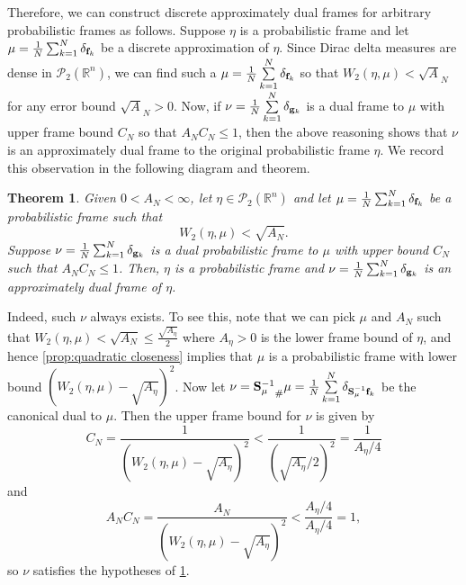 \documentclass{amsart}
\numberwithin{equation}{section}
\theoremstyle{plain}
\newtheorem{theorem}{Theorem}[section]
\theoremstyle{remark}
\theoremstyle{definition}
\begin{document}
Therefore, we can construct discrete approximately dual frames for arbitrary probabilistic frames as follows. Suppose $\eta$ is a probabilistic frame and let $\mu = \frac{1}{N}\sum_{k=1}^N \delta_{{\bf f}_k}$ be a discrete approximation of $\eta$. Since Dirac delta measures are dense in $\mathcal{P}_2(\mathbb{R}^n)$, we can find such a $\mu =\frac{1}{N}\sum\limits_{k=1}^N \delta_{{\bf f}_k}$ so that $W_2(\eta, \mu) < \sqrt{A}_N$ for any error bound $\sqrt{A}_N > 0$. 
Now, if $\nu= \frac{1}{N}\sum\limits_{k=1}^N \delta_{{\bf g}_k}$ is a dual frame to $\mu$ with upper frame bound $C_N$ so that $A_NC_N \leq 1$, then the above reasoning shows that $\nu$ is an approximately dual frame to the original probabilistic frame $\eta$. We record this observation in the following diagram and theorem.

\begin{center}
\end{center}

\begin{theorem}\label{thm:discrete approx dual}
Given $0<A_N< \infty$, let $\eta \in \mathcal{P}_2(\mathbb{R}^n)$ and let $\mu =\frac{1}{N} \sum_{k=1}^N \delta_{{\bf f}_k}$ be a probabilistic frame such that  
    \begin{equation*}
        W_2(\eta, \mu)  < \sqrt{A_N}.
    \end{equation*}
    Suppose $\nu= \frac{1}{N}\sum_{k=1}^N \delta_{{\bf g}_k}$ is a dual probabilistic frame to $\mu$ with upper bound $C_N$ such that $A_N C_N\leq 1$.  
 Then, $\eta$ is a probabilistic frame and $\nu=\frac{1}{N}\sum_{k=1}^N \delta_{{\bf g}_k}$ is an approximately dual frame of $\eta$.
\end{theorem}

Indeed, such $\nu$ always exists. To see this, note that we can pick $\mu$ and $A_N$ such that $W_2(\eta, \mu) < \sqrt{A_N} \leq \frac{\sqrt{A_\eta}}{2}$ where $A_\eta>0$ is the lower frame bound of $\eta$, and hence \cref{prop:quadratic closeness} implies that $\mu$ is a probabilistic frame with lower bound $(W_2(\eta, \mu) - \sqrt{A_\eta})^2$. Now let $\nu= {{\bf S}_{\mu}^{-1}}_\# \mu = \frac{1}{N}\sum\limits_{k=1}^N \delta_{{\bf S}_{\mu}^{-1}{\bf f}_k}$ be the canonical dual to $\mu$. Then the upper frame bound for $\nu$ is given by $$C_N = \frac{1}{(W_2(\eta, \mu) - \sqrt{A_\eta})^2} < \frac{1}{(\sqrt{A_\eta}/2)^2} = \frac{1}{A_\eta/4}$$ and $$A_NC_N = \frac{A_N}{(W_2(\eta, \mu) - \sqrt{A_\eta})^2} < \frac{A_\eta/4}{A_\eta/4} = 1,$$ so $\nu$ satisfies the hypotheses of \cref{thm:discrete approx dual}.
\end{document}
